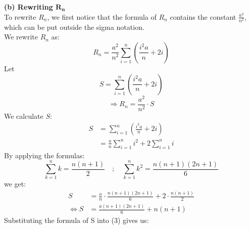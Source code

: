 \textbf{(b) Rewriting $\mathbf{R_n}$} \\
    To rewrite $R_n$, we first notice that the formula of $R_n$ contains the constant \(\displaystyle\frac{a^2}{n^2}\), which can be put outside the sigma notation.\\
    We rewrite $R_n$ as: \[R_n = \frac{a^2}{n^2}\sum_{i=1}^n (\frac{i^{2}a}{n} + 2i)\]
    Let \[S = \sum_{i=1}^n \left(\frac{i^{2}a}{n} + 2i\right)\] 
    \begin{equation}
    \Longrightarrow R_n = \frac{a^2}{n^2}\cdot S
    \end{equation}
    We calculate $S$:
    \begin{align*}
        S &= \sum_{i=1}^n \left(\frac{i^{2}a}{n} + 2i\right) \\
        &= \frac{a}{n}\sum_{i=1}^n i^2 + 2\sum_{i=1}^ni
    \end{align*}
    By applying the formulas:  \[\sum_{k=1}^n k = \frac{n(n+1)}{2}\quad; \quad\sum_{k=1}^n k^2 = \frac{n(n+1)(2n+1)}{6}\]we get:
    \begin{align*}
        S &= \frac{a}{n} \cdot \frac{n(n+1)(2n+1)}{6} + 2\cdot \frac{n(n+1)}{2} \\
        \iff S &= \frac{a(n+1)(2n+1)}{6} + n(n+1) 
    \end{align*}
    Substituting the formula of S into (3) gives us:
    
    \begin{center}  \end{center}

